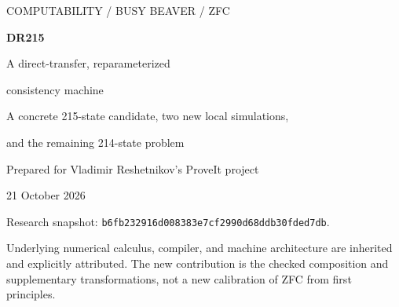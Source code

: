 \documentclass[11pt,a4paper]{article}
\theoremstyle{definition}
\newcommand{\Con}{\operatorname{Con}}
\numberwithin{equation}{section}
\begin{document}
\hypersetup{pageanchor=false}
\begin{titlepage}
\vspace*{1.2cm}
{\color{muted}\large COMPUTABILITY / BUSY BEAVER / ZFC}\par
\vspace{0.7cm}
{\color{ink}\Huge\bfseries DR215}\par
\vspace{0.35cm}
{\color{ink}\LARGE A direct-transfer, reparameterized\par consistency machine}\par
\vspace{0.7cm}
{\Large A concrete 215-state candidate, two new local simulations,\par and the remaining 214-state problem}\par
\vspace{0.8cm}
{\large Prepared for Vladimir Reshetnikov's ProveIt project\par 21 October 2026}\par
\vspace{1.2cm}
\begin{abstract}
We give an exact binary, one-tape Turing machine DR215 with 215 working
states and an ordinary mathematical proof, formalizable in ZFC, that its
blank-tape nonhalting is equivalent to $\Con(\mathrm{ZFC})$. The construction
combines the accepted 35-occurrence single-guard transfer implementation
with a changed sixth-axiom sampler. Its source has 201 distinct subtrees
and 4,732 primitive occurrences. Only two transition rows differ from
the accepted direct-transfer machine, but the axiom produced at a fixed
command argument changes; a corresponding proof compiler is supplied.

Fresh unbounded runtime verification covers all 6,151 guarded primitive
cases and all 430 transition rows. A complete 70,506-transition blank
prefix matches a 177-step synthetic axiom prefix, yielding the protected
startup invariant. Four additional 215-state tables realize two new
predecessor-marker transformations and their compositions; their halting
equivalence holds on every initial tape from state zero.

On the formalism side, antecedent exchange gives a calibrated family of
numerical calculi. An exhaustive 279,936-recipe source census for one
changed row attains 204 source nodes, so that experiment does not improve
the state bound. All positive artifacts, exact tables, finite certificates,
and portable checkers accompany the report. \textbf{No 214-state machine,
new proof-assistant kernel endpoint, or state lower bound is claimed.}
\end{abstract}
\vfill
{\small\color{muted}
Research snapshot: \texttt{b6fb232916d008383e7cf2990d68ddb30fded7db}.\par
Underlying numerical calculus, compiler, and machine architecture are
inherited and explicitly attributed. The new contribution is the checked
composition and supplementary transformations, not a new calibration of
ZFC from first principles.}
\end{titlepage}
\end{document}
